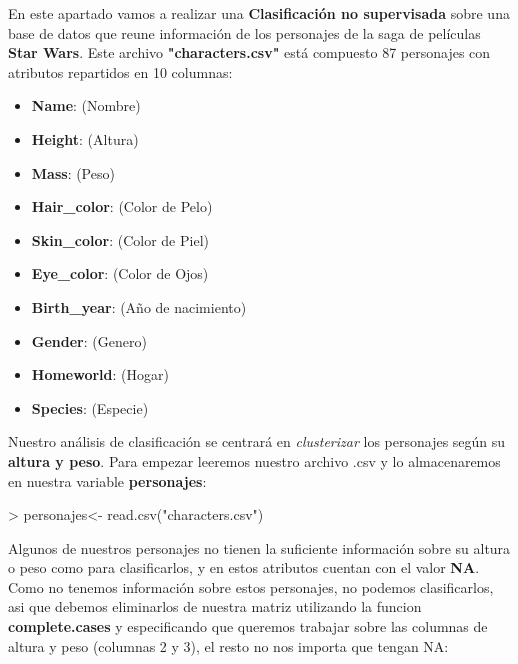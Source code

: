 \documentclass [a4paper] {article}
\begin{document}
En este apartado vamos a realizar una \textbf{Clasificación no supervisada} sobre una base de datos que reune información
de los personajes de la saga de películas \textbf{Star Wars}.
Este archivo \textbf{"characters.csv"} está compuesto 87 personajes con atributos repartidos en 10 columnas:
\begin{itemize}
	\item \textbf{Name}: (Nombre)
	\item \textbf{Height}: (Altura) 
	\item \textbf{Mass}: (Peso)
	\item \textbf{Hair\_color}: (Color de Pelo)
	\item \textbf{Skin\_color}: (Color de Piel)
	\item \textbf{Eye\_color}: (Color de Ojos)
	\item \textbf{Birth\_year}: (Año de nacimiento)
	\item \textbf{Gender}: (Genero)
	\item \textbf{Homeworld}: (Hogar)
	\item \textbf{Species}: (Especie)
\end{itemize}

Nuestro análisis de clasificación se centrará en \textit{clusterizar} los personajes según su \textbf{altura y peso}.
Para empezar leeremos nuestro archivo .csv y lo almacenaremos en nuestra variable \textbf{personajes}:

\begin{Schunk}
\begin{Sinput}
> personajes<- read.csv("characters.csv")
\end{Sinput}
\end{Schunk}

Algunos de nuestros personajes no tienen la suficiente información sobre su altura o peso como para clasificarlos, y en
estos atributos cuentan con el valor \textbf{NA}. Como no tenemos información sobre estos personajes, no podemos clasificarlos,
asi que debemos eliminarlos de nuestra matriz utilizando la funcion \textbf{complete.cases} y especificando que queremos trabajar
sobre las columnas de altura y peso (columnas 2 y 3), el resto no nos importa que tengan NA:
\end{document}
